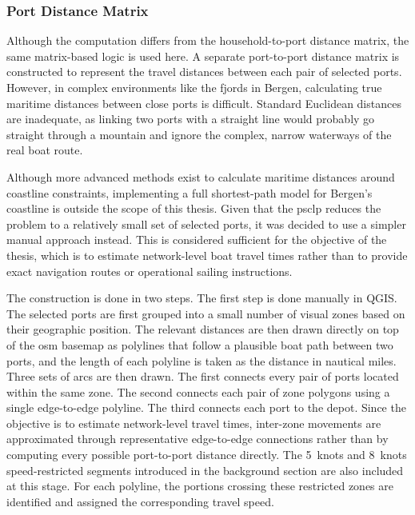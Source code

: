\documentclass[12pt]{article}
\begin{document}
\subsubsection{Port Distance Matrix}
\label{subsubsec:port-distance-matrix}

Although the computation differs from the household-to-port distance matrix, the same matrix-based logic is used here. A separate port-to-port distance matrix is constructed to represent the travel distances between each pair of selected ports. However, in complex environments like the fjords in Bergen, calculating true maritime distances between close ports is difficult. Standard Euclidean distances are inadequate, as linking two ports with a straight line would probably go straight through a mountain and ignore the complex, narrow waterways of the real boat route.

Although more advanced methods exist to calculate maritime distances around coastline constraints, implementing a full shortest-path model for Bergen's coastline is outside the scope of this thesis. Given that the \ac{psclp} reduces the problem to a relatively small set of selected ports, it was decided to use a simpler manual approach instead. This is considered sufficient for the objective of the thesis, which is to estimate network-level boat travel times rather than to provide exact navigation routes or operational sailing instructions.

The construction is done in two steps. The first step is done manually in QGIS. The selected ports are first grouped into a small number of visual zones based on their geographic position. The relevant distances are then drawn directly on top of the \ac{osm} basemap as polylines that follow a plausible boat path between two ports, and the length of each polyline is taken as the distance in nautical miles. Three sets of arcs are then drawn. The first connects every pair of ports located within the same zone. The second connects each pair of zone polygons using a single edge-to-edge polyline. The third connects each port to the depot. Since the objective is to estimate network-level travel times, inter-zone movements are approximated through representative edge-to-edge connections rather than by computing every possible port-to-port distance directly. The \qty{5}{knots} and \qty{8}{knots} speed-restricted segments introduced in the background section are also included at this stage. For each polyline, the portions crossing these restricted zones are identified and assigned the corresponding travel speed.
\end{document}
